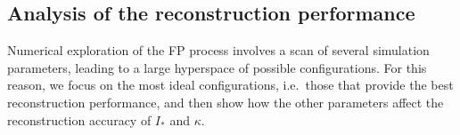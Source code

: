 {%

\subsection{Analysis of the reconstruction performance}


Numerical exploration of the FP process involves a scan of several simulation parameters, leading to a large hyperspace of possible configurations. For this reason, we focus on the most ideal configurations, i.e.\ those that provide the best reconstruction performance, and then show how the other parameters affect the reconstruction accuracy of $I_\ast$ and $\kappa$.

}
